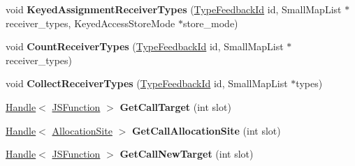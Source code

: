 \begin{DoxyCompactItemize}
\item 
\hypertarget{classv8_1_1internal_1_1_type_feedback_oracle_ad1407da181c883aab8ae857a5ca20292}{}void {\bfseries Keyed\+Assignment\+Receiver\+Types} (\hyperlink{classv8_1_1internal_1_1_type_feedback_id}{Type\+Feedback\+Id} id, Small\+Map\+List $\ast$receiver\+\_\+types, Keyed\+Access\+Store\+Mode $\ast$store\+\_\+mode)\label{classv8_1_1internal_1_1_type_feedback_oracle_ad1407da181c883aab8ae857a5ca20292}

\item 
\hypertarget{classv8_1_1internal_1_1_type_feedback_oracle_a628c36048a606efd2c82b702c39878f2}{}void {\bfseries Count\+Receiver\+Types} (\hyperlink{classv8_1_1internal_1_1_type_feedback_id}{Type\+Feedback\+Id} id, Small\+Map\+List $\ast$receiver\+\_\+types)\label{classv8_1_1internal_1_1_type_feedback_oracle_a628c36048a606efd2c82b702c39878f2}

\item 
\hypertarget{classv8_1_1internal_1_1_type_feedback_oracle_a1e36491514435777e8937b2b1589329a}{}void {\bfseries Collect\+Receiver\+Types} (\hyperlink{classv8_1_1internal_1_1_type_feedback_id}{Type\+Feedback\+Id} id, Small\+Map\+List $\ast$types)\label{classv8_1_1internal_1_1_type_feedback_oracle_a1e36491514435777e8937b2b1589329a}

\item 
\hypertarget{classv8_1_1internal_1_1_type_feedback_oracle_a40978c20162153d0e753e82f7887fe4b}{}\hyperlink{classv8_1_1internal_1_1_handle}{Handle}$<$ \hyperlink{classv8_1_1internal_1_1_j_s_function}{J\+S\+Function} $>$ {\bfseries Get\+Call\+Target} (int slot)\label{classv8_1_1internal_1_1_type_feedback_oracle_a40978c20162153d0e753e82f7887fe4b}

\item 
\hypertarget{classv8_1_1internal_1_1_type_feedback_oracle_a8d51b092bbbe04a018c6c0ec60c6fb9d}{}\hyperlink{classv8_1_1internal_1_1_handle}{Handle}$<$ \hyperlink{classv8_1_1internal_1_1_allocation_site}{Allocation\+Site} $>$ {\bfseries Get\+Call\+Allocation\+Site} (int slot)\label{classv8_1_1internal_1_1_type_feedback_oracle_a8d51b092bbbe04a018c6c0ec60c6fb9d}

\item 
\hypertarget{classv8_1_1internal_1_1_type_feedback_oracle_a8db8590ebf1c5de30d2053e5873d383f}{}\hyperlink{classv8_1_1internal_1_1_handle}{Handle}$<$ \hyperlink{classv8_1_1internal_1_1_j_s_function}{J\+S\+Function} $>$ {\bfseries Get\+Call\+New\+Target} (int slot)\label{classv8_1_1internal_1_1_type_feedback_oracle_a8db8590ebf1c5de30d2053e5873d383f}


\end{DoxyCompactItemize}
